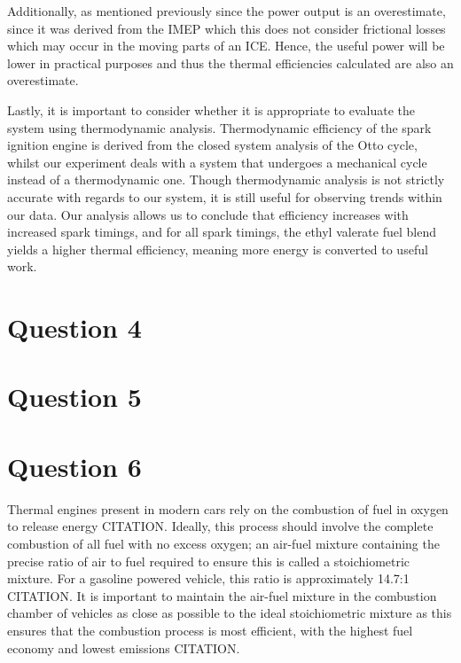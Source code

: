 \documentclass[11pt]{article}
\begin{document}
Additionally, as mentioned previously since the power output is an overestimate, since it was derived from the IMEP which this does not consider frictional losses which may occur in the moving parts of an ICE. Hence, the useful power will be lower in practical purposes and thus the thermal efficiencies calculated are also an overestimate. 

Lastly, it is important to consider whether it is appropriate to evaluate the system using thermodynamic analysis. Thermodynamic efficiency of the spark ignition engine is derived from the closed system analysis of the Otto cycle, whilst our experiment deals with a system that undergoes a mechanical cycle instead of a thermodynamic one. Though thermodynamic analysis is not strictly accurate with regards to our system, it is still useful for observing trends within our data. Our analysis allows us to conclude that efficiency increases with increased spark timings, and for all spark timings, the ethyl valerate fuel blend yields a higher thermal efficiency, meaning more energy is converted to useful work.  
\section*{Question 4}
\section*{Question 5}
\section*{Question 6}
Thermal engines present in modern cars rely on the combustion of fuel in oxygen to release energy CITATION. Ideally, this process should involve the complete combustion of all fuel with no excess oxygen; an air-fuel mixture containing the precise ratio of air to fuel required to ensure this is called a stoichiometric mixture. For a gasoline powered vehicle, this ratio is approximately 14.7:1 CITATION. It is important to maintain the air-fuel mixture in the combustion chamber of vehicles as close as possible to the ideal stoichiometric mixture as this ensures that the combustion process is most efficient, with the highest fuel economy and lowest emissions CITATION.
\end{document}
